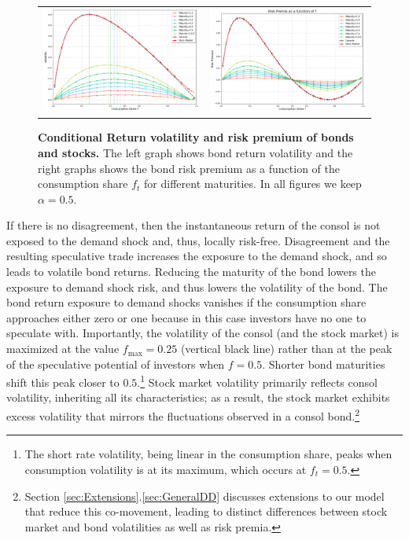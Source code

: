 \documentclass[preprint,11pt,authoryear]{elsarticle}
\theoremstyle{plain}
\begin{document}
\begin{figure}[htbp]
\centering
\vspace{0.1in}
\begin{tabular}{cc}
\includegraphics[width=.45\textwidth]{figures/volAPV3.png} &
\includegraphics[width=.45\textwidth]{figures/RPV3.png}
\end{tabular}
\caption{\textbf{Conditional Return volatility and risk premium of bonds and stocks.} \footnotesize{The left graph shows bond return volatility and the right graphs shows the bond risk premium as a function of the consumption share $f_t$ for different maturities. In all figures we keep $\alpha = 0.5$.}} \label{fig:VolaRiskPremium2f}  
 \end{figure}

If there is no disagreement, then the instantaneous return of the consol is not exposed to the demand shock and, thus, locally risk-free. Disagreement and the resulting speculative trade increases the exposure to the demand shock, and so leads to volatile bond returns. Reducing the maturity of the bond lowers the exposure to demand shock risk, and thus lowers the volatility of the bond. The bond return exposure to demand shocks vanishes if the consumption share approaches either zero or one because in this case investors have no one to speculate with. Importantly, the volatility of the consol (and the stock market) is maximized at the value $f_{\text{max}} = 0.25$ (vertical black line) rather than at the peak of the speculative potential of investors when $f=0.5$. %
Shorter bond maturities shift this peak closer to $0.5$.\footnote{The short rate volatility, being linear in the consumption share, peaks when consumption volatility is at its maximum, which occurs at $f_t = 0.5$.}  Stock market volatility primarily reflects consol volatility, inheriting all its characteristics; as a result, the stock market exhibits excess volatility that mirrors the fluctuations observed in a consol bond.\footnote{Section \ref{sec:Extensions}.\ref{sec:GeneralDD} discusses extensions to our model that reduce this co-movement, leading to distinct differences between stock market and bond volatilities as well as risk premia.}
\end{document}
